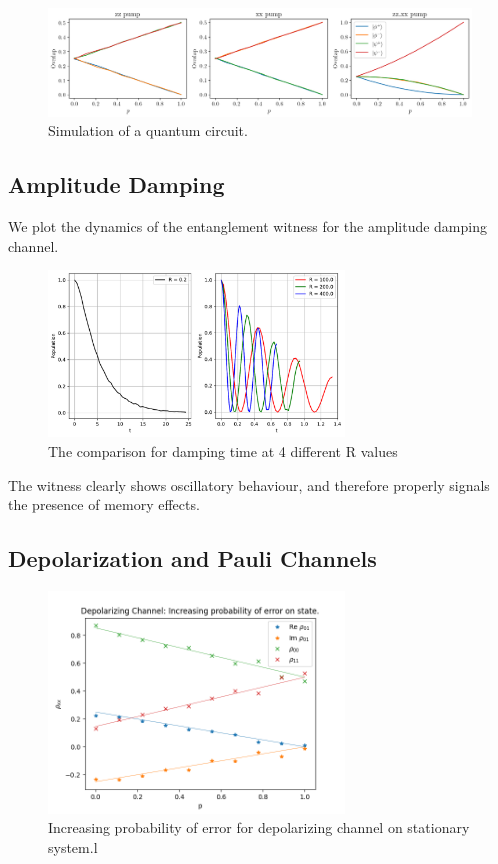 \documentclass[12pt]{article}
\begin{document}
  \begin{figure}[h]
    \centering
    \includegraphics[width=\textwidth]{images/reservoir-engineering-simulation}
    \caption{Simulation of a quantum circuit.%
      \label{fig:reservoir-engineering-simulation}}
  \end{figure}
  \subsection{Amplitude Damping}
  We plot the dynamics of the entanglement witness for the amplitude damping channel.
  
  \begin{figure}[h]
    \centering
    \includegraphics[width=0.7\textwidth]{images/amplitude_damping_population_non_markovianity}
    \caption{The comparison for damping time at 4 different R values %
            \label{fig:amplitude_damping_population}}
  \end{figure}

  The witness clearly shows oscillatory behaviour, and therefore properly signals the presence of memory effects.

\subsection{Depolarization and Pauli Channels}
\begin{figure}
  \centering
  \includegraphics[width=0.7\textwidth]{images/depolarizing_probability_state.png}
  \caption{Increasing probability of error for depolarizing channel on stationary system.l}
  \label{fig:depolarizing_probability_state}
\end{figure}
\end{document}
